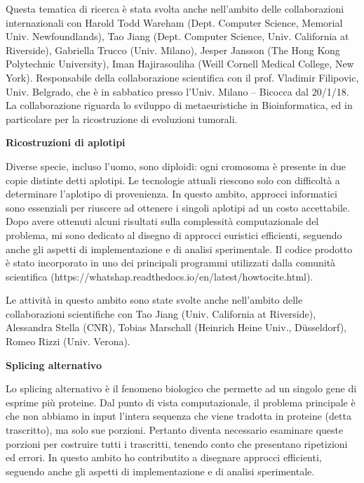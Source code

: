 \documentclass[11pt,a4paper,roman]{moderncv}        %
\begin{document}
  Questa tematica di ricerca è stata svolta anche nell'ambito delle
  collaborazioni internazionali con Harold Todd Wareham (Dept. Computer
  Science, Memorial Univ. Newfoundlands), Tao Jiang (Dept. Computer
  Science, Univ. California at Riverside), Gabriella Trucco (Univ.
  Milano), Jesper Jansson (The Hong Kong Polytechnic University), Iman
  Hajirasouliha (Weill Cornell Medical College, New York). Responsabile
  della collaborazione scientifica con il prof. Vladimir Filipovic, Univ.
  Belgrado, che è in sabbatico presso l'Univ. Milano -- Bicocca dal 20/1/18.
  La collaborazione riguarda lo sviluppo di metaeuristiche in
  Bioinformatica, ed in particolare per la ricostruzione di evoluzioni
  tumorali.

  \textbf{Ricostruzioni di aplotipi}

  Diverse specie, incluso l'uomo, sono diploidi: ogni cromosoma è presente
  in due copie distinte detti aplotipi. Le tecnologie attuali riescono
  solo con difficoltà a determinare l'aplotipo di provenienza. In questo
  ambito, approcci informatici sono essenziali per riuscere ad ottenere i
  singoli aplotipi ad un costo accettabile. Dopo avere ottenuti alcuni
  risultati sulla complessità computazionale del problema, mi sono
  dedicato al disegno di approcci euristici efficienti, seguendo anche gli
  aspetti di implementazione e di analisi sperimentale. Il codice prodotto
  è stato incorporato in uno dei principali programmi utilizzati dalla
  comunità scientifica
  (https://whatshap.readthedocs.io/en/latest/howtocite.html).

  Le attività in questo ambito sono state svolte anche nell'ambito delle
  collaborazioni scientifiche con Tao Jiang (Univ. California at
  Riverside), Alessandra Stella (CNR), Tobias Marschall (Heinrich Heine
  Univ., Düsseldorf), Romeo Rizzi (Univ. Verona).

  \textbf{Splicing alternativo}

  Lo splicing alternativo è il fenomeno biologico che permette ad un
  singolo gene di esprime più proteine. Dal punto di vista computazionale,
  il problema principale è che non abbiamo in input l'intera sequenza che
  viene tradotta in proteine (detta trascritto), ma solo sue porzioni.
  Pertanto diventa necessario esaminare queste porzioni per costruire
  tutti i trascritti, tenendo conto che presentano ripetizioni ed errori.
  In questo ambito ho contributito a disegnare approcci efficienti,
  seguendo anche gli aspetti di implementazione e di analisi sperimentale.
\end{document}
